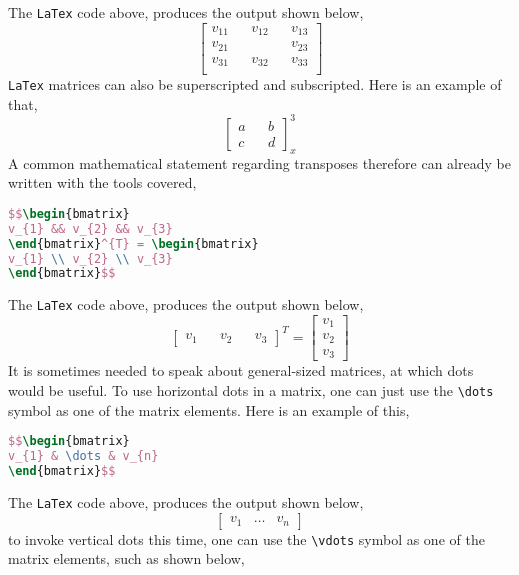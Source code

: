 \documentclass[a4paper, 12pt]{report}
\begin{document}
\begin{center}
\begin{lstlisting}[language=tex]
\end{lstlisting}
The \texttt{LaTex} code above, produces the output shown below,
$$\begin{bmatrix}
v_{11} && v_{12} && v_{13} \\ 
v_{21} &&  && v_{23} \\ 
v_{31} && v_{32} && v_{33} \\ 
\end{bmatrix}$$
\texttt{LaTex} matrices can also be superscripted and subscripted. Here is an example of that,
$$\begin{bmatrix}
a && b \\
c && d
\end{bmatrix}^{3}_{x}$$
A common mathematical statement regarding transposes therefore can already be written with the tools covered,
\begin{lstlisting}[language=tex]
$$\begin{bmatrix}
v_{1} && v_{2} && v_{3}
\end{bmatrix}^{T} = \begin{bmatrix}
v_{1} \\ v_{2} \\ v_{3}
\end{bmatrix}$$
\end{lstlisting}
The \texttt{LaTex} code above, produces the output shown below,
$$\begin{bmatrix}
v_{1} && v_{2} && v_{3}
\end{bmatrix}^{T} = \begin{bmatrix}
v_{1} \\ v_{2} \\ v_{3}
\end{bmatrix}$$
It is sometimes needed to speak about general-sized matrices, at which dots would be useful. To use horizontal dots in a matrix, one can just use the \texttt{\textbackslash dots} symbol as one of the matrix elements. Here is an example of this,
\begin{lstlisting}[language=tex]
$$\begin{bmatrix}
v_{1} & \dots & v_{n}
\end{bmatrix}$$
\end{lstlisting}
The \texttt{LaTex} code above, produces the output shown below,
$$\begin{bmatrix}
v_{1} & \dots & v_{n}
\end{bmatrix}$$
to invoke vertical dots this time, one can use the \texttt{\textbackslash vdots} symbol as one of the matrix elements, such as shown below,
\begin{lstlisting}[language=tex]

\end{lstlisting}
\end{center}
\end{document}
